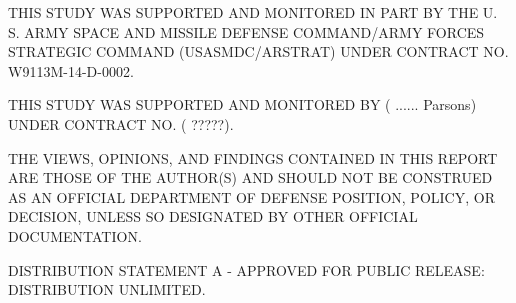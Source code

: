 
\begin{flushleft}

\begin{small}
\textsf{
THIS STUDY WAS SUPPORTED AND MONITORED IN PART BY THE U. S. ARMY SPACE AND MISSILE DEFENSE COMMAND/ARMY FORCES STRATEGIC COMMAND (USASMDC/ARSTRAT) UNDER CONTRACT NO. W9113M-14-D-0002.
}

\textsf{
THIS STUDY WAS SUPPORTED AND MONITORED BY ({\color{red} ......  Parsons}) UNDER CONTRACT NO. ({\color{red} ?????}).
}

\textsf{
THE VIEWS, OPINIONS, AND FINDINGS CONTAINED IN THIS REPORT ARE THOSE OF THE AUTHOR(S) AND SHOULD NOT BE CONSTRUED AS AN OFFICIAL DEPARTMENT OF DEFENSE POSITION, POLICY, OR DECISION, UNLESS SO DESIGNATED BY OTHER OFFICIAL DOCUMENTATION.
}

\textsf{
DISTRIBUTION STATEMENT A - APPROVED FOR PUBLIC RELEASE: DISTRIBUTION UNLIMITED.
}
\end{small}


\end{flushleft} 
